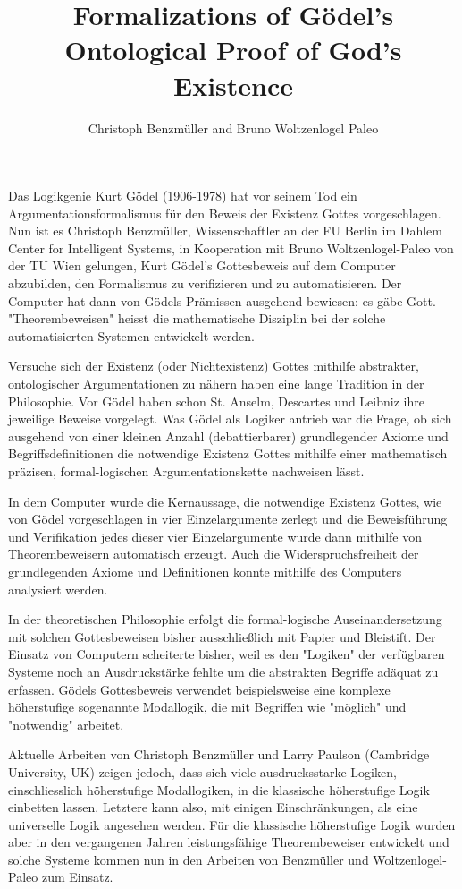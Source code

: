 \documentclass{article}
\author{Christoph Benzm\"{u}ller and Bruno Woltzenlogel Paleo}
\title{Formalizations of G\"{o}del's Ontological Proof of God's Existence}
\begin{document}
\maketitle

Das Logikgenie Kurt Gödel (1906-1978) hat vor seinem Tod ein
Argumentationsformalismus für den Beweis der Existenz Gottes
vorgeschlagen. Nun ist es Christoph Benzmüller, Wissenschaftler an der FU
Berlin im Dahlem Center for Intelligent Systems, in Kooperation mit
Bruno Woltzenlogel-Paleo von der TU Wien gelungen, Kurt Gödel's
Gottesbeweis auf dem Computer abzubilden, den Formalismus zu
verifizieren und zu automatisieren. Der Computer hat dann von Gödels
Prämissen ausgehend bewiesen: es gäbe Gott. "Theorembeweisen" heisst
die mathematische Disziplin bei der solche automatisierten Systemen
entwickelt werden.

Versuche sich der Existenz (oder Nichtexistenz) Gottes mithilfe
abstrakter, ontologischer Argumentationen zu nähern haben eine lange
Tradition in der Philosophie. Vor Gödel haben schon St. Anselm,
Descartes und Leibniz ihre jeweilige Beweise vorgelegt. Was Gödel als
Logiker antrieb war die Frage, ob sich ausgehend von einer kleinen
Anzahl (debattierbarer) grundlegender Axiome und Begriffsdefinitionen
die notwendige Existenz Gottes mithilfe einer mathematisch präzisen,
formal-logischen Argumentationskette nachweisen lässt.

In dem Computer wurde die Kernaussage, die notwendige Existenz Gottes,
wie von Gödel vorgeschlagen in vier Einzelargumente zerlegt und die
Beweisführung und Verifikation jedes dieser vier Einzelargumente wurde
dann mithilfe von Theorembeweisern automatisch erzeugt. Auch die
Widerspruchsfreiheit der grundlegenden Axiome und Definitionen konnte
mithilfe des Computers analysiert werden.

In der theoretischen Philosophie erfolgt die formal-logische
Auseinandersetzung mit solchen Gottesbeweisen bisher ausschließlich
mit Papier und Bleistift. Der Einsatz von Computern scheiterte bisher,
weil es den "Logiken" der verfügbaren Systeme noch an Ausdruckstärke
fehlte um die abstrakten Begriffe adäquat zu erfassen. Gödels
Gottesbeweis verwendet beispielsweise eine komplexe höherstufige
sogenannte Modallogik, die mit Begriffen wie "möglich" und
"notwendig" arbeitet.

Aktuelle Arbeiten von Christoph Benzmüller und Larry Paulson
(Cambridge University, UK) zeigen jedoch, dass sich viele
ausdrucksstarke Logiken, einschliesslich höherstufige Modallogiken, in
die klassische höherstufige Logik einbetten lassen. Letztere kann
also, mit einigen Einschränkungen, als eine universelle Logik
angesehen werden. Für die klassische höherstufige Logik wurden aber in
den vergangenen Jahren leistungsfähige
Theorembeweiser entwickelt und solche Systeme kommen nun in den
Arbeiten von Benzmüller und Woltzenlogel-Paleo zum Einsatz.
\end{document}
